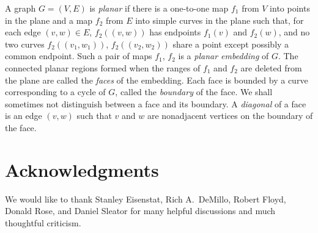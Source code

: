 \documentclass[12pt]{article}
\theoremstyle{remark}
\begin{document}
A graph $G = (V, E)$ is \emph{planar} if there is a one-to-one map $f_1$ from $V$
into points in the plane and a map $f_2$ from $E$ into simple curves in the plane
such that, for each edge $(v, w) \in E$, $f_2((v, w))$ has endpoints $f_1(v)$ and
$f_2(w)$, and no two curves $f_2((v_1, w_1))$, $f_2((v_2, w_2))$ share a point
except possibly a common endpoint. Such a pair of maps $f_1$, $f_2$ is a \emph{planar
embedding} of $G$. The connected planar regions formed when the ranges of $f_1$ and
$f_2$ are deleted from the plane are called the \emph{faces} of the embedding. Each
face is bounded by a curve corresponding to a cycle of $G$, called the
\emph{boundary} of the face. We shall sometimes not distinguish between a face and
its boundary. A \emph{diagonal} of a face is an edge $(v, w)$ such that $v$ and $w$
are nonadjacent vertices on the boundary of the face.

\section*{Acknowledgments}

We would like to thank Stanley Eisenstat, Rich A.\ DeMillo, Robert Floyd, Donald
Rose, and Daniel Sleator for many helpful discussions and much thoughtful criticism.
\end{document}
